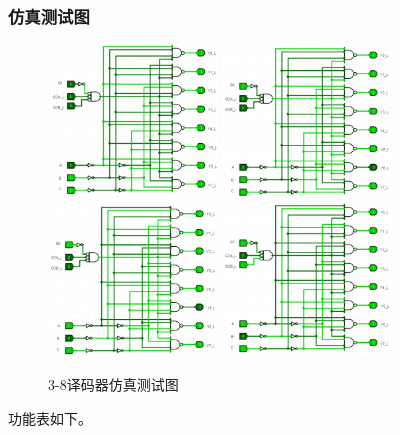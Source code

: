 \documentclass{article}
\begin{document}
    \subsubsection{仿真测试图}
    \begin{figure}[H]
    \centering
    \includegraphics[width=0.4\textwidth]{1.5.1.png}
    \includegraphics[width=0.4\textwidth]{1.5.2.png}
    \includegraphics[width=0.4\textwidth]{1.5.3.png}
    \includegraphics[width=0.4\textwidth]{1.5.4.png}
    \caption{3-8译码器仿真测试图}
    \end{figure}
    功能表如下。
\end{document}
